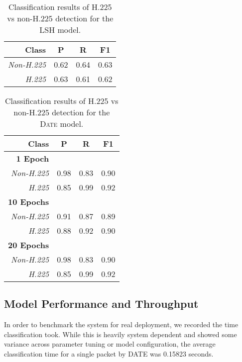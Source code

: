 \begin{table} [h!]
\centering
\begin{tabular}{| r | c | c | c |}
\hline
Class & P & R & F1 \\
\hline
\textit{Non-H.225} & 0.62 & 0.64 & 0.63 \\
\textit{H.225} & 0.63 & 0.61 & 0.62 \\
\hline
\end{tabular}
\caption{Classification results of H.225 vs non-H.225 detection for the LSH model.}
\label{tab:h225resultslsh}
\end{table}


\begin{table} [h!]
\centering
\begin{tabular}{| r | c | c | c |}
\hline
Class & P & R & F1 \\
\hline
\textbf{1 Epoch} &&& \\
\textit{Non-H.225} & 0.98 & 0.83 & 0.90 \\
\textit{H.225} & 0.85 & 0.99 & 0.92 \\
\hline
\textbf{10 Epochs} &&& \\
\textit{Non-H.225} & 0.91 & 0.87 & 0.89 \\
\textit{H.225} & 0.88 & 0.92 & 0.90 \\
\hline
\textbf{20 Epochs} &&& \\
\textit{Non-H.225} & 0.98 & 0.83 & 0.90 \\
\textit{H.225} & 0.85 & 0.99 & 0.92 \\
\hline
\end{tabular}
\caption{Classification results of H.225 vs non-H.225 detection for the \textsc{Date} model.}
\label{tab:h225results}
\end{table}

\subsection{Model Performance and Throughput}
In order to benchmark the system for real deployment, we recorded the time classification took. While this is heavily system dependent and showed some variance across parameter tuning or model configuration, the average classification time for a single packet by \textsc{DATE} was 0.15823 seconds.

